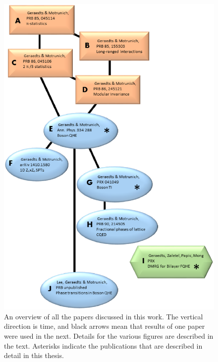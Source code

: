 \begin{figure}
\includegraphics[width=\linewidth]{figures/publications.eps}
\caption{ An overview of all the papers discussed in this work. The vertical direction is time, and black arrows mean that results of one paper were used in the next. Details for the various figures are described in the text. Asterisks indicate the publications that are described in detail in this thesis.
\label{papers}}
\end{figure}

